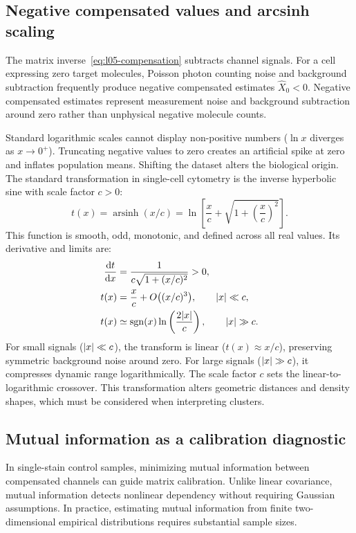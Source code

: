 \subsection{Negative compensated values and arcsinh scaling}
\label{subsec:l05-arcsinh}
The matrix inverse~\eqref{eq:l05-compensation} subtracts channel signals. For a cell expressing zero target molecules, Poisson photon counting noise and background subtraction frequently produce negative compensated estimates $\widehat{X}_0 < 0$. Negative compensated estimates represent measurement noise and background subtraction around zero rather than unphysical negative molecule counts.

Standard logarithmic scales cannot display non-positive numbers ($\ln x$ diverges as $x \to 0^+$). Truncating negative values to zero creates an artificial spike at zero and inflates population means. Shifting the dataset alters the biological origin. The standard transformation in single-cell cytometry is the inverse hyperbolic sine with scale factor $c>0$:
\begin{equation}
t(x)=\operatorname{arsinh}(x/c)
=\ln\left[\frac xc+\sqrt{1+\left(\frac xc\right)^2}\right].
\label{eq:l05-arcsinh}
\end{equation}
This function is smooth, odd, monotonic, and defined across all real values. Its derivative and limits are:
\begin{align}
\frac{\mathrm{d} t}{\mathrm{d} x}&=\frac1{c\sqrt{1+(x/c)^2}}>0,\label{eq:l05-arcsinh-derivative}\\
t(x)&=\frac xc+O\big((x/c)^3\big),\qquad \lvert x\rvert\ll c,\label{eq:l05-arcsinh-small}\\
t(x)&\simeq\operatorname{sgn}(x)\ln\left(\frac{2\lvert x\rvert}c\right),
\qquad \lvert x\rvert\gg c.
\label{eq:l05-arcsinh-large}
\end{align}
For small signals ($\lvert x\rvert\ll c$), the transform is linear ($t(x) \approx x/c$), preserving symmetric background noise around zero. For large signals ($\lvert x\rvert\gg c$), it compresses dynamic range logarithmically. The scale factor $c$ sets the linear-to-logarithmic crossover. This transformation alters geometric distances and density shapes, which must be considered when interpreting clusters.

\subsection{Mutual information as a calibration diagnostic}
\label{subsec:l05-mi-calibration}
In single-stain control samples, minimizing mutual information between compensated channels can guide matrix calibration. Unlike linear covariance, mutual information detects nonlinear dependency without requiring Gaussian assumptions. In practice, estimating mutual information from finite two-dimensional empirical distributions requires substantial sample sizes.

